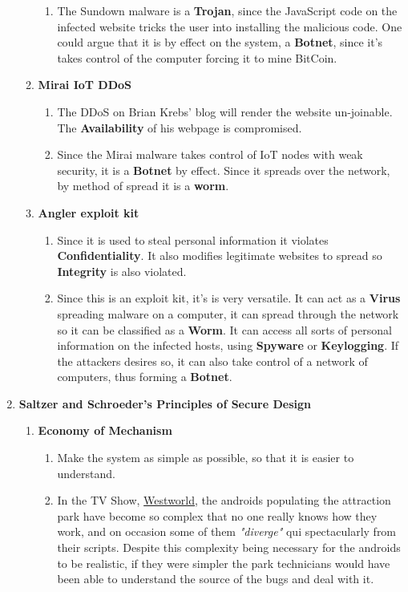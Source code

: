\documentclass[12pt]{article}
\begin{document}
\begin{enumerate}
\begin{enumerate}
\begin{enumerate}
				\item The Sundown malware is a \textbf{Trojan}, since the JavaScript code on the infected website tricks the user into installing the malicious code. One could argue that it is by effect on the system, a \textbf{Botnet}, since it's takes control of the computer forcing it to mine BitCoin.
			\end{enumerate}
			\item \textbf{Mirai IoT DDoS}
			\begin{enumerate}
				\item The DDoS on Brian Krebs' blog will render the website un-joinable. The \textbf{Availability} of his webpage is compromised.
				\item Since the Mirai malware takes control of IoT nodes with weak security, it is a \textbf{Botnet} by effect. Since it spreads over the network, by method of spread it is a \textbf{worm}.
			\end{enumerate}
			\item \textbf{Angler exploit kit}
			\begin{enumerate}
				\item Since it is used to steal personal information it violates \textbf{Confidentiality}. It also modifies legitimate websites to spread so \textbf{Integrity} is also violated.
				\item Since this is an exploit kit, it's is very versatile. It can act as a \textbf{Virus} spreading malware on a computer, it can spread through the network so it can be classified as a \textbf{Worm}. It can access all sorts of personal information on the infected hosts, using \textbf{Spyware} or \textbf{Keylogging}. If the attackers desires so, it can also take control of a network of computers, thus forming a \textbf{Botnet}.
			\end{enumerate}
		\end{enumerate}
		\item \textbf{Saltzer and Schroeder's Principles of Secure Design}
			\begin{enumerate}
			\item \textbf{Economy of Mechanism}
				\begin{enumerate}
					\item Make the system as simple as possible, so that it is easier to understand.
					\item In the TV Show, \underline{Westworld}, the androids populating the attraction park have become so complex that no one really knows how they work, and on occasion some of them \textit{"diverge"} qui spectacularly from their scripts. Despite this complexity being necessary for the androids to be realistic, if they were simpler the park technicians would have been able to understand the source of the bugs and deal with it. 

\end{enumerate}
\end{enumerate}
\end{enumerate}
\end{document}
